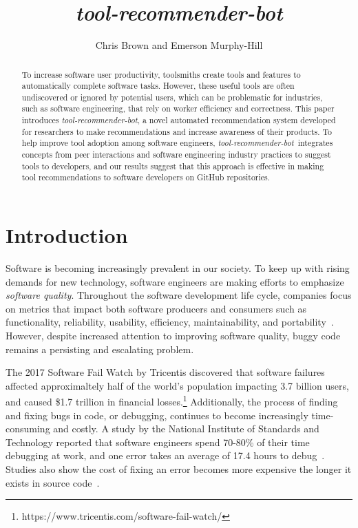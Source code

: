 \documentclass[sigconf,review,anonymous]{acmart}
\newcommand{\tool}{\textsl{tool-recommender-bot}}
\begin{document}

\title{\tool}

\author{Chris Brown and Emerson Murphy-Hill}

\begin{abstract}
To increase software user productivity, toolsmiths create tools and features to automatically complete software tasks. However, these useful tools are often undiscovered or ignored by potential users, which can be problematic for industries, such as software engineering, that rely on worker efficiency and correctness. This paper introduces \tool, a novel automated recommendation system developed for researchers to make recommendations and increase awareness of their products. To help improve tool adoption among software engineers, \tool~integrates concepts from peer interactions and software engineering industry practices to suggest tools to developers, and our results suggest that this approach is effective in making tool recommendations to software developers on GitHub repositories.
\end{abstract}

\maketitle

\section{Introduction}

Software is becoming increasingly prevalent in our society. To keep up with rising demands for new technology, software engineers are making efforts to emphasize \textit{software quality}. Throughout the software development life cycle, companies focus on metrics that impact both software producers and consumers such as functionality, reliability, usability, efficiency, maintainability, and portability~\cite{KitchenhamQualityTarget}. However, despite increased attention to improving software quality, buggy code remains a persisting and escalating problem. 

The 2017 Software Fail Watch by Tricentis discovered that software failures affected approximaltely half of the world's population impacting 3.7 billion users, and caused \$1.7 trillion in financial losses.\footnote{https://www.tricentis.com/software-fail-watch/} Additionally, the process of finding and fixing bugs in code, or debugging, continues to become increasingly time-consuming and costly.  A study by the National Institute of Standards and Technology reported that software engineers spend 70-80\% of their time debugging at work, and one error takes an average of 17.4 hours to debug~\cite{NIST}. Studies also show the cost of fixing an error becomes more expensive the longer it exists in source code~\cite{SEEconomics, SoftwareAssuranceSDLC}.
\end{document}
